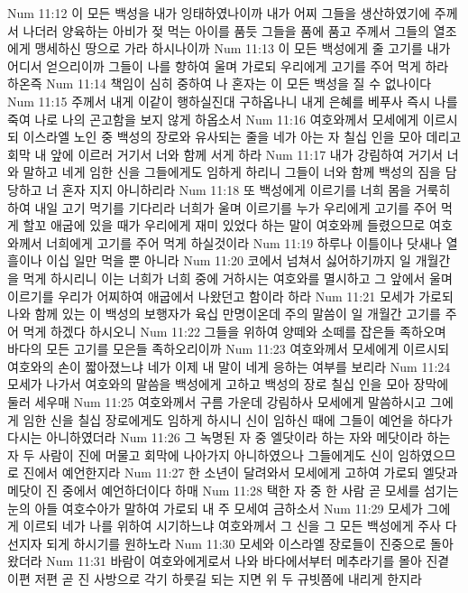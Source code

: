 Num 11:12  이 모든 백성을 내가 잉태하였나이까 내가 어찌 그들을 생산하였기에 주께서 나더러 양육하는 아비가 젖 먹는 아이를 품듯 그들을 품에 품고 주께서 그들의 열조에게 맹세하신 땅으로 가라 하시나이까
Num 11:13  이 모든 백성에게 줄 고기를 내가 어디서 얻으리이까 그들이 나를 향하여 울며 가로되 우리에게 고기를 주어 먹게 하라 하온즉
Num 11:14  책임이 심히 중하여 나 혼자는 이 모든 백성을 질 수 없나이다
Num 11:15  주께서 내게 이같이 행하실진대 구하옵나니 내게 은혜를 베푸사 즉시 나를 죽여 나로 나의 곤고함을 보지 않게 하옵소서
Num 11:16  여호와께서 모세에게 이르시되 이스라엘 노인 중 백성의 장로와 유사되는 줄을 네가 아는 자 칠십 인을 모아 데리고 회막 내 앞에 이르러 거기서 너와 함께 서게 하라
Num 11:17  내가 강림하여 거기서 너와 말하고 네게 임한 신을 그들에게도 임하게 하리니 그들이 너와 함께 백성의 짐을 담당하고 너 혼자 지지 아니하리라
Num 11:18  또 백성에게 이르기를 너희 몸을 거룩히 하여 내일 고기 먹기를 기다리라 너희가 울며 이르기를 누가 우리에게 고기를 주어 먹게 할꼬 애굽에 있을 때가 우리에게 재미 있었다 하는 말이 여호와께 들렸으므로 여호와께서 너희에게 고기를 주어 먹게 하실것이라
Num 11:19  하루나 이틀이나 닷새나 열흘이나 이십 일만 먹을 뿐 아니라
Num 11:20  코에서 넘쳐서 싫어하기까지 일 개월간을 먹게 하시리니 이는 너희가 너희 중에 거하시는 여호와를 멸시하고 그 앞에서 울며 이르기를 우리가 어찌하여 애굽에서 나왔던고 함이라 하라
Num 11:21  모세가 가로되 나와 함께 있는 이 백성의 보행자가 육십 만명이온데 주의 말씀이 일 개월간 고기를 주어 먹게 하겠다 하시오니
Num 11:22  그들을 위하여 양떼와 소떼를 잡은들 족하오며 바다의 모든 고기를 모은들 족하오리이까
Num 11:23  여호와께서 모세에게 이르시되 여호와의 손이 짧아졌느냐 네가 이제 내 말이 네게 응하는 여부를 보리라
Num 11:24  모세가 나가서 여호와의 말씀을 백성에게 고하고 백성의 장로 칠십 인을 모아 장막에 둘러 세우매
Num 11:25  여호와께서 구름 가운데 강림하사 모세에게 말씀하시고 그에게 임한 신을 칠십 장로에게도 임하게 하시니 신이 임하신 때에 그들이 예언을 하다가 다시는 아니하였더라
Num 11:26  그 녹명된 자 중 엘닷이라 하는 자와 메닷이라 하는 자 두 사람이 진에 머물고 회막에 나아가지 아니하였으나 그들에게도 신이 임하였으므로 진에서 예언한지라
Num 11:27  한 소년이 달려와서 모세에게 고하여 가로되 엘닷과 메닷이 진 중에서 예언하더이다 하매
Num 11:28  택한 자 중 한 사람 곧 모세를 섬기는 눈의 아들 여호수아가 말하여 가로되 내 주 모세여 금하소서
Num 11:29  모세가 그에게 이르되 네가 나를 위하여 시기하느냐 여호와께서 그 신을 그 모든 백성에게 주사 다 선지자 되게 하시기를 원하노라
Num 11:30  모세와 이스라엘 장로들이 진중으로 돌아왔더라
Num 11:31  바람이 여호와에게로서 나와 바다에서부터 메추라기를 몰아 진곁 이편 저편 곧 진 사방으로 각기 하룻길 되는 지면 위 두 규빗쯤에 내리게 한지라
